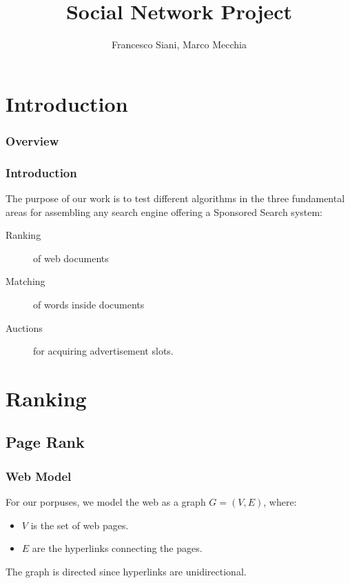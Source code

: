\documentclass{beamer}
\title{Social Network Project}
\author{Francesco Siani, Marco Mecchia}
\institute{Università degli Studi di Salerno}
\begin{document}
\SetVertexNormal[Shape      = circle,
                 FillColor  = orange,
                 LineWidth  = 2pt]
\SetUpEdge[lw         = 1.5pt,
           color      = black,
           labelcolor = white,
           labeltext  = red,
           labelstyle = {sloped,draw,text=blue}]

\section{Introduction}
\begin{frame}
   \maketitle
\end{frame}

\begin{frame}
\frametitle{Overview}
\small
\tableofcontents
\end{frame}

\begin{frame}
\frametitle{Introduction}
The purpose of our work is to test different algorithms in the three fundamental areas for assembling any search engine offering a Sponsored Search system:
\begin{description}
\item[Ranking]  of web documents
\item[Matching] of words inside documents
\item[Auctions] for acquiring advertisement slots.
\end{description}
\end{frame}

\section{Ranking}

\subsection{Page Rank}
\begin{frame}
\frametitle{Web Model}
For our porpuses, we model the web as a graph $G = (V,E)$, where:
\begin{itemize}
\item $V$ is the set of web pages.
\item $E$ are the hyperlinks connecting the pages.
\end{itemize}
\vfill
The graph is directed since hyperlinks are unidirectional.
\end{frame}
\end{document}
